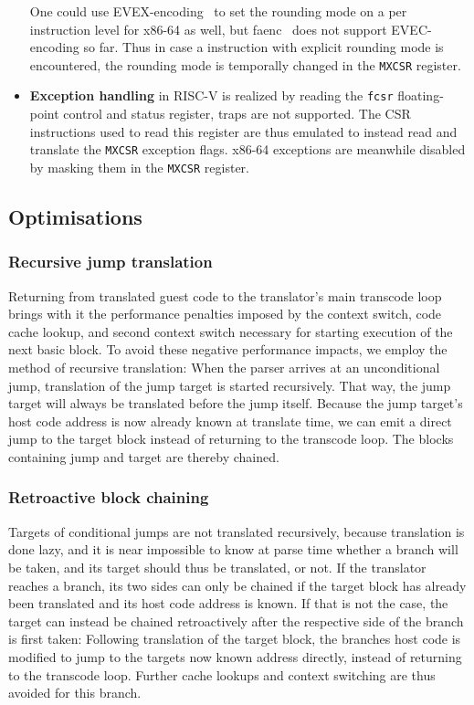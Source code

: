 \begin{itemize}
            One could use EVEX-encoding~\cite[S. 374]{intel2017man} to set the rounding mode on a per instruction level for x86-64 as well, but faenc~\cite{faenc} does not support EVEC-encoding so far.  %
            Thus in case a instruction with explicit rounding mode is encountered, the rounding mode is temporally changed in the \texttt{MXCSR} register.
    \item \textbf{Exception handling} in RISC-V is realized by reading the \texttt{fcsr} floating-point control and status register, traps are not supported.
            The CSR instructions used to read this register are thus emulated to instead read and translate the \texttt{MXCSR} exception flags.
            x86-64 exceptions are meanwhile disabled by masking them in the \texttt{MXCSR} register.
\end{itemize}


\subsection{Optimisations}
\label{sec:optimise}

\subsubsection{Recursive jump translation}
\label{sec:recursive_translation}
Returning from translated guest code to the translator's main transcode loop brings with it the performance penalties imposed by the context switch, code cache lookup, and second context switch necessary for starting execution of the next basic block.
To avoid these negative performance impacts, we employ the method of recursive translation: When the parser arrives at an unconditional jump, translation of the jump target is started recursively.
That way, the jump target will always be translated before the jump itself.
Because the jump target's host code address is now already known at translate time, we can emit a direct jump to the target block instead of returning to the transcode loop.
The blocks containing jump and target are thereby chained.

\subsubsection{Retroactive block chaining}
\label{sec:chaining}
Targets of conditional jumps are not translated recursively, because translation is done lazy, and it is near impossible to know at parse time whether a branch will be taken, and its target should thus be translated, or not.
If the translator reaches a branch, its two sides can only be chained if the target block has already been translated and its host code address is known.
If that is not the case, the target can instead be chained retroactively after the respective side of the branch is first taken: Following translation of the target block, the branches host code is modified to jump to the targets now known address directly, instead of returning to the transcode loop.
Further cache lookups and context switching are thus avoided for this branch.

